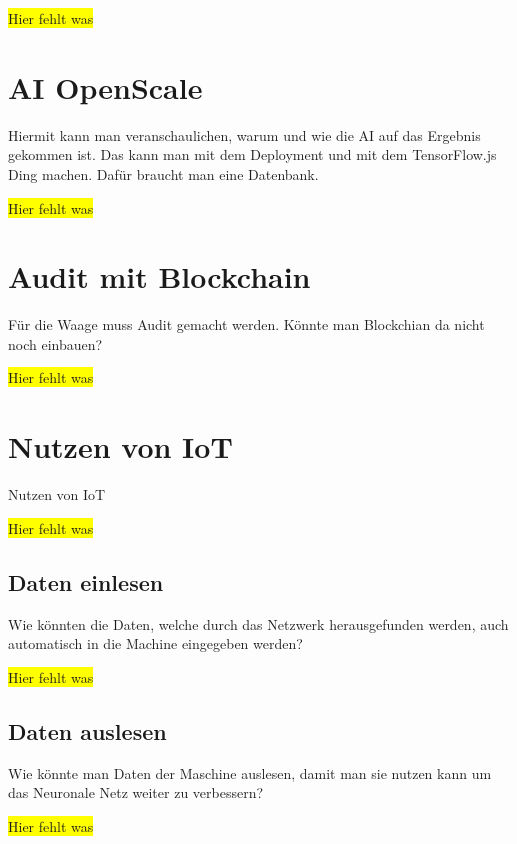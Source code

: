 \colorbox{yellow}{Hier fehlt was}

\section{AI OpenScale}
Hiermit kann man veranschaulichen, warum und wie die AI auf das Ergebnis gekommen ist. Das kann man mit dem Deployment
und mit dem TensorFlow.js Ding machen. Dafür braucht man eine Datenbank.

\colorbox{yellow}{Hier fehlt was}

\section{Audit mit Blockchain}
Für die Waage muss Audit gemacht werden. Könnte man Blockchian da nicht noch einbauen?

\colorbox{yellow}{Hier fehlt was}

\section{Nutzen von IoT}
Nutzen von IoT

\colorbox{yellow}{Hier fehlt was}

\subsection{Daten einlesen}
Wie könnten die Daten, welche durch das Netzwerk herausgefunden werden, auch automatisch in die Machine eingegeben werden?

\colorbox{yellow}{Hier fehlt was}

\subsection{Daten auslesen}
Wie könnte man Daten der Maschine auslesen, damit man sie nutzen kann um das Neuronale Netz weiter zu verbessern?

\colorbox{yellow}{Hier fehlt was}